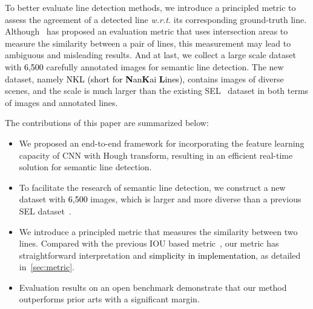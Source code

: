 \documentclass[10pt,journal,cspaper,compsoc]{IEEEtran}
\newcommand{\revise}[1]{{\textcolor{black}{#1}}}
\begin{document}
To better evaluate line detection methods, we introduce a principled metric to assess
the agreement of a detected line \textsl{w.r.t.} its corresponding ground-truth line.
%
Although~\cite{lee2017semantic} has proposed an evaluation metric that uses intersection areas to measure the similarity between a pair of lines,
this measurement may lead to ambiguous and misleading results.
%
And at last, we collect a large scale dataset with \revise{6,500} carefully annotated images for semantic
line detection.
%
The new dataset, namely \revise{NKL (short for \textbf{N}an\textbf{K}ai \textbf{L}ines),}
contains images of diverse scenes,
and the scale is much larger than the existing SEL~\cite{lee2017semantic} dataset
in both terms of images and annotated lines.

The contributions of this paper are summarized below:
\begin{itemize}\setlength\itemsep{0.3em}
  \item We proposed an end-to-end framework for incorporating the feature learning capacity of CNN with Hough transform, resulting in an efficient real-time solution for semantic line detection.
  
  \item To facilitate the research of semantic line detection, we construct
    a new dataset with \revise{6,500} images, which is larger and more diverse than a previous SEL dataset~\cite{lee2017semantic}.
  
  \item We introduce a principled metric that measures the similarity between two lines. 
    Compared with the previous IOU based metric~\cite{lee2017semantic},
    our metric has straightforward interpretation and \revise{simplicity in implementation},
    as detailed in~\cref{sec:metric}.
  
    \item Evaluation results on an open benchmark demonstrate that our method 
    outperforms prior arts with a significant margin.
\end{itemize}
\end{document}

